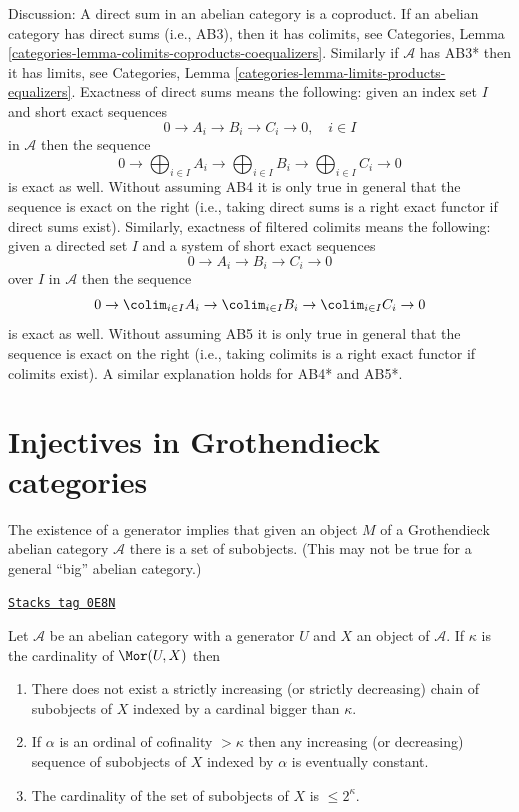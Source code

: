 Discussion: A direct sum in an abelian category is a coproduct.
If an abelian category has direct sums (i.e., AB3), then it has colimits, see
Categories, Lemma \ref{categories-lemma-colimits-coproducts-coequalizers}.
Similarly if $\mathcal{A}$ has AB3* then it has limits, see
Categories, Lemma \ref{categories-lemma-limits-products-equalizers}.
Exactness of direct sums means the following: given an index set $I$
and short exact sequences
$$
0 \to A_i \to B_i \to C_i \to 0,\quad i \in I
$$
in $\mathcal{A}$ then the sequence
$$
0 \to
\bigoplus\nolimits_{i \in I} A_i \to
\bigoplus\nolimits_{i \in I} B_i \to
\bigoplus\nolimits_{i \in I} C_i \to 0
$$
is exact as well. Without assuming AB4 it is only true in general that
the sequence is exact on the right (i.e., taking direct sums is a right
exact functor if direct sums exist). Similarly, exactness of filtered
colimits means the following: given a directed set $I$
and a system of short exact sequences
$$
0 \to A_i \to B_i \to C_i \to 0
$$
over $I$ in $\mathcal{A}$ then the sequence
$$
0 \to
\colim_{i \in I} A_i \to
\colim_{i \in I} B_i \to
\colim_{i \in I} C_i \to 0
$$
is exact as well. Without assuming AB5 it is only true in general that
the sequence is exact on the right (i.e., taking colimits is a right
exact functor if colimits exist). A similar explanation holds for
AB4* and AB5*.

\section{Injectives in Grothendieck categories}
\label{injectives-section-grothendieck-categories}
The existence of a generator implies that given an object $M$ of a
Grothendieck abelian category $\mathcal{A}$ there is a set of subobjects.
(This may not be true for a general ``big'' abelian category.)

\begin{lemma}
\label{injectives-lemma-set-of-subobjects}
\href{https://stacks.math.columbia.edu/tag/0E8N}{\texttt{Stacks tag 0E8N}}

Let $\mathcal{A}$ be an abelian category with a generator $U$ and
$X$ an object of $\mathcal{A}$. If $\kappa$ is the cardinality of
$\Mor(U, X)$ then
\begin{enumerate}
\item There does not exist a strictly increasing
(or strictly decreasing) chain of subobjects
of $X$ indexed by a cardinal bigger than $\kappa$.
\item If $\alpha$ is an ordinal of cofinality $> \kappa$
then any increasing (or decreasing) sequence of subobjects
of $X$ indexed by $\alpha$ is eventually constant.
\item The cardinality of the set of subobjects of $X$
is $\leq 2^\kappa$.
\end{enumerate}
\end{lemma}

